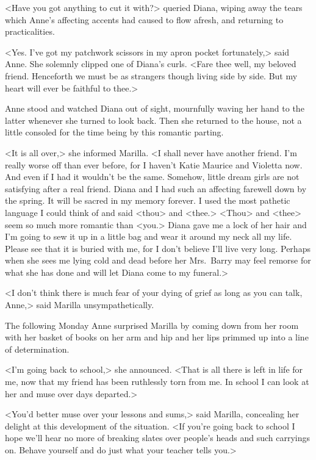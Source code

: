 <Have you got anything to cut it with?> queried Diana, wiping away the tears which Anne's affecting accents had caused to flow afresh, and returning to practicalities.

<Yes. I've got my patchwork scissors in my apron pocket fortunately,> said Anne. She solemnly clipped one of Diana's curls. <Fare thee well, my beloved friend. Henceforth we must be as strangers though living side by side. But my heart will ever be faithful to thee.>

Anne stood and watched Diana out of sight, mournfully waving her hand to the latter whenever she turned to look back. Then she returned to the house, not a little consoled for the time being by this romantic parting.

<It is all over,> she informed Marilla. <I shall never have another friend. I'm really worse off than ever before, for I haven't Katie Maurice and Violetta now. And even if I had it wouldn't be the same. Somehow, little dream girls are not satisfying after a real friend. Diana and I had such an affecting farewell down by the spring. It will be sacred in my memory forever. I used the most pathetic language I could think of and said <thou> and <thee.> <Thou> and <thee> seem so much more romantic than <you.> Diana gave me a lock of her hair and I'm going to sew it up in a little bag and wear it around my neck all my life. Please see that it is buried with me, for I don't believe I'll live very long. Perhaps when she sees me lying cold and dead before her Mrs.~Barry may feel remorse for what she has done and will let Diana come to my funeral.>

<I don't think there is much fear of your dying of grief as long as you can talk, Anne,> said Marilla unsympathetically.

The following Monday Anne surprised Marilla by coming down from her room with her basket of books on her arm and hip and her lips primmed up into a line of determination.

<I'm going back to school,> she announced. <That is all there is left in life for me, now that my friend has been ruthlessly torn from me. In school I can look at her and muse over days departed.>

<You'd better muse over your lessons and sums,> said Marilla, concealing her delight at this development of the situation. <If you're going back to school I hope we'll hear no more of breaking slates over people's heads and such carryings on. Behave yourself and do just what your teacher tells you.>

